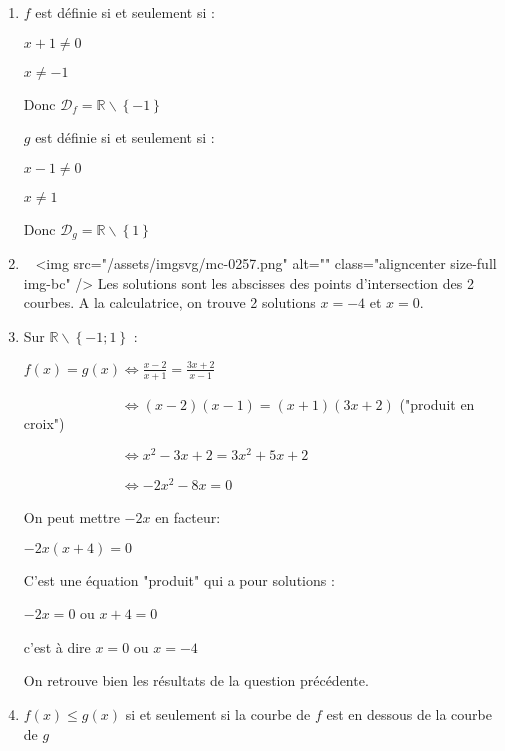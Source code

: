 \begin{corrige}
     \begin{enumerate}
          \item
          $f$ est définie si et seulement si :
          \par
          $x+1\neq 0$
          \par
          $x\neq -1$
          \par
          Donc $\mathscr D_{f}=\mathbb{R}\backslash\left\{-1\right\}$
          \par
          $g$ est définie si et seulement si :
          \par
          $x-1\neq 0$
          \par
          $x\neq 1$
          \par
          Donc $\mathscr D_{g}=\mathbb{R}\backslash\left\{1\right\}$
          \item
          ~
          <img src="/assets/imgsvg/mc-0257.png" alt="" class="aligncenter size-full  img-bc" />
          Les solutions sont les abscisses des points d'intersection des 2 courbes. A la calculatrice, on trouve 2 solutions $x=-4$ et $x=0$.
          \item
          Sur $\mathbb{R}\backslash\left\{-1 ; 1\right\}$ :
          \par
          $f\left(x\right) = g\left(x\right)  \Leftrightarrow  \frac{x-2}{x+1} = \frac{3x+2}{x-1}$
          \par
          $\phantom{f\left(x\right) = g\left(x\right)} \Leftrightarrow (x-2)(x-1)=(x+1)(3x+2)$ ("produit en croix")
          \par
          $\phantom{f\left(x\right) = g\left(x\right)} \Leftrightarrow x^2-3x+2=3x^2+5x+2$
          \par
          $\phantom{f\left(x\right) = g\left(x\right)} \Leftrightarrow -2x^2-8x=0$
          \par
          On peut mettre $-2x$ en facteur:
          \par
          $-2x(x+4)=0$
          \par
          C'est une équation "produit" qui a pour solutions :
          \par
          $-2x=0$ ou $x+4=0$
          \par
          c'est à dire $x=0$ ou $x=-4$
          \par
          On retrouve bien les résultats de la question précédente.
          \item
          $f\left(x\right)\leqslant g\left(x\right)$ si et seulement si la courbe de $f$ est en dessous de la courbe de $g$

\end{enumerate}
\end{corrige}
